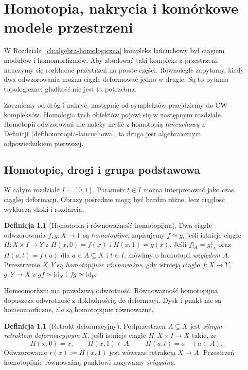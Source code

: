 \documentclass[11pt,a4paper,oneside]{report}
\newcommand{\id}{\mathrm{id}}
\theoremstyle{plain}
\theoremstyle{definition}
\newtheorem{definicja}[twierdzenie]{Definicja}
\theoremstyle{remark}
\begin{document}
\chapter{Homotopia, nakrycia i komórkowe modele przestrzeni}
\label{ch:topologia-algebraiczna-podstawy}

W Rozdziale~\ref{ch:algebra-homologiczna} kompleks łańcuchowy
był ciągiem modułów i homomorfizmów. Aby zbudować taki
kompleks z przestrzeni, nauczymy się rozkładać przestrzeń
na proste części. Równolegle zapytamy, kiedy dwa odwzorowania
można ciągle deformować jedno w drugie. Są to pytania
topologiczne: gładkość nie jest tu potrzebna.

Zaczniemy od dróg i nakryć, następnie od sympleksów
przejdziemy do CW-kompleksów. Homologia tych obiektów
pojawi się w następnym rozdziale. Homotopii odwzorowań
nie należy mylić z homotopią \emph{łańcuchową}
z Definicji~\ref{def:homotopia-lancuchowa};
ta druga jest algebraicznym odpowiednikiem pierwszej.

\section{Homotopie, drogi i grupa podstawowa}
\label{sec:homotopie-pi1}

W całym rozdziale $I=[0,1]$. Parametr $t\in I$
można interpretować jako czas ciągłej deformacji.
Obrazy pośrednie mogą być bardzo różne, lecz
ciągłość wyklucza skoki i rozdarcia.

\begin{definicja}[Homotopia i równoważność homotopijna]
\label{def:homotopia-topologiczna}
Dwa ciągłe odwzorowania $f,g:X\to Y$ są
\emph{homotopijne}, zapisujemy $f\simeq g$,
jeśli istnieje ciągłe $H:X\times I\to Y$ z
$H(x,0)=f(x)$ i $H(x,1)=g(x)$.
Jeśli $f|_A=g|_A$ oraz $H(a,t)=f(a)$
dla $a\in A\subseteq X$ i $t\in I$,
mówimy o homotopii \emph{względem $A$}.
Przestrzenie $X,Y$ są \emph{homotopijnie
równoważne}, gdy istnieją ciągłe $f:X\to Y$,
$g:Y\to X$ z $gf\simeq\id_X$ i
$fg\simeq\id_Y$.
\end{definicja}

Homeomorfizm ma prawdziwą odwrotność.
Równoważność homotopijna dopuszcza odwrotność
z dokładnością do deformacji. Dysk i punkt
nie są homeomorficzne, ale są homotopijnie
równoważne.

\begin{definicja}[Retrakt deformacyjny]
\label{def:retrakt-deformacyjny}
Podprzestrzeń $A\subseteq X$ jest
\emph{silnym retraktem deformacyjnym} $X$,
jeśli istnieje ciągłe $H:X\times I\to X$ takie, że
\[
 H(x,0)=x,\qquad H(x,1)\in A,\qquad
 H(a,t)=a\quad(a\in A).
\]
Odwzorowanie $r(x):=H(x,1)$ jest wówczas
retrakcją $X\to A$. Przestrzeń homotopijnie
równoważną punktowi nazywamy \emph{ściągalną}.
\end{definicja}
\end{document}
